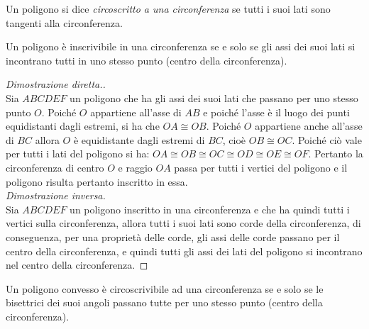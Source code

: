 \begin{definizione}
Un poligono si dice \emph{circoscritto a una circonferenza} se tutti i suoi lati sono tangenti alla circonferenza.
\end{definizione}

\begin{figure}[htb]
	\centering
\end{figure}

\begin{teorema}
Un poligono è inscrivibile in una circonferenza se e solo se gli assi dei suoi lati si incontrano tutti in uno stesso punto (centro della circonferenza).
\end{teorema}

\begin{figure}[htb]
	\centering
\end{figure}
\begin{proof}[Dimostrazione diretta.]~\\
Sia $ABCDEF$ un poligono che ha gli assi dei suoi lati che passano per uno stesso punto $O$. Poiché $O$ appartiene all'asse di $AB$ e poiché l'asse è il luogo dei punti equidistanti dagli estremi, si ha che $OA\cong OB$. Poiché $O$ appartiene anche all'asse di $BC$ allora $O$ è equidistante dagli estremi di $BC$, cioè $OB\cong OC$. Poiché ciò vale per tutti i lati del poligono si ha: $OA\cong OB\cong OC\cong OD\cong OE\cong OF$. Pertanto la circonferenza di centro $O$ e raggio $OA$ passa per tutti i vertici del poligono e il poligono risulta pertanto inscritto in essa.\\
\emph{Dimostrazione inversa.}\\
Sia $ABCDEF$ un poligono inscritto in una circonferenza e che ha quindi tutti i vertici sulla circonferenza, allora tutti i suoi lati sono corde della circonferenza, di conseguenza, per una proprietà delle corde, gli assi delle corde passano per il centro della circonferenza, e quindi tutti gli assi dei lati del poligono si incontrano nel centro della circonferenza.
\end{proof}

\begin{teorema}
Un poligono convesso è circoscrivibile ad una circonferenza se e solo se le bisettrici dei suoi angoli passano tutte per uno stesso punto (centro della circonferenza).
\end{teorema}

